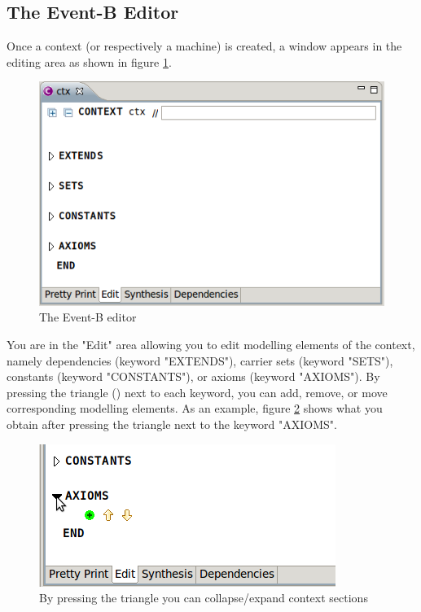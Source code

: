 \subsection{The Event-B Editor}
\label{ref_01_the_eventb_editor}

Once a context (or respectively a machine) is created, a window appears in the editing area as shown in figure \ref{fig_ref_01_eventb_editor1}.

\begin{figure}[!h]
\begin{center}
	\includegraphics{img/reference/ref_01_eventb_editor1.png}
	\caption{The Event-B editor}
	\label{fig_ref_01_eventb_editor1}
\end{center}
\end{figure}

You are in the "Edit" area allowing you to edit modelling elements of the context, namely dependencies (keyword "EXTENDS"), carrier sets (keyword "SETS"), constants (keyword "CONSTANTS"), or axioms (keyword "AXIOMS"). By pressing the triangle () next to each keyword, you can add, remove, or move corresponding modelling elements. As an example, figure \ref{fig_ref_01_eventb_editor2} shows what you obtain after pressing the triangle next to the keyword "AXIOMS".

\begin{figure}[!h]
\begin{center}
	\includegraphics{img/reference/ref_01_eventb_editor2.png}
	\caption{By pressing the triangle you can collapse/expand context sections}
	\label{fig_ref_01_eventb_editor2}
\end{center}
\end{figure}

